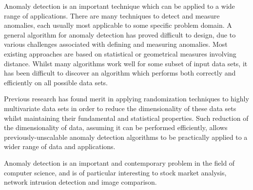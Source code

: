 Anomaly detection is an important technique which can be applied to a wide 
range of applications. There are many techniques to detect and measure 
anomalies, each usually most applicable to some specific problem domain. A 
general algorithm for anomaly detection has proved difficult to design, due to 
various challenges associated with defining and measuring anomalies. Most 
existing approaches are based on statistical or geometrical measures involving 
distance. Whilst many algorithms work well for some subset of input data sets, 
it has been difficult to discover an algorithm which performs both correctly and
efficiently on all possible data sets.

Previous research has found merit in applying randomization techniques to highly
multivariate data sets in order to reduce the dimensionality of these data sets 
whilst maintaining their fundamental and statistical properties. Such reduction 
of the dimensionality of data, assuming it can be performed efficiently, allows 
previously-unscalable anomaly detection algorithms to be practically applied to 
a wider range of data and applications.

Anomaly detection is an important and contemporary problem in the field of 
computer science, and is of particular interesting to stock market analysis, 
network intrusion detection and image comparison.
